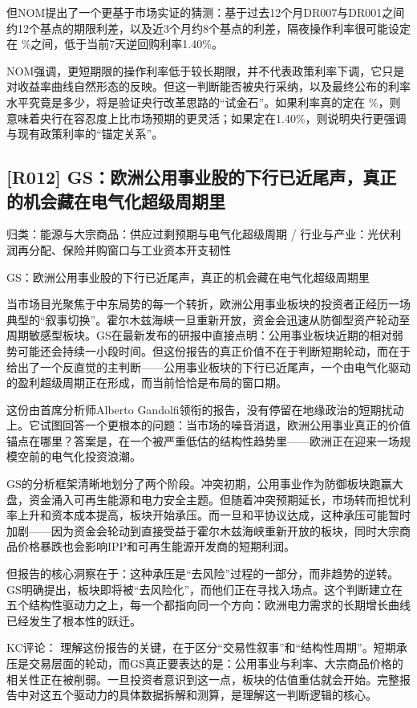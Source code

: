 \documentclass[11pt]{ctexart}
\begin{document}
但NOM提出了一个更基于市场实证的猜测：基于过去12个月DR007与DR001之间约12个基点的期限利差，以及近3个月约8个基点的利差，隔夜操作利率很可能设定在 \%之间，低于当前7天逆回购利率1.40\%。

NOM强调，更短期限的操作利率低于较长期限，并不代表政策利率下调，它只是对收益率曲线自然形态的反映。但这一判断能否被央行采纳，以及最终公布的利率水平究竟是多少，将是验证央行改革思路的“试金石”。如果利率真的定在 \%，则意味着央行在容忍度上比市场预期的更灵活；如果定在1.40\%，则说明央行更强调与现有政策利率的“锚定关系”。

\subsection{[R012] GS：欧洲公用事业股的下行已近尾声，真正的机会藏在电气化超级周期里}
{\small\color{refgray}归类：能源与大宗商品：供应过剩预期与电气化超级周期 / 行业与产业：光伏利润再分配、保险并购窗口与工业资本开支韧性}

GS：欧洲公用事业股的下行已近尾声，真正的机会藏在电气化超级周期里

当市场目光聚焦于中东局势的每一个转折，欧洲公用事业板块的投资者正经历一场典型的“叙事切换”。霍尔木兹海峡一旦重新开放，资金会迅速从防御型资产轮动至周期敏感型板块。GS在最新发布的研报中直接点明：公用事业板块近期的相对弱势可能还会持续一小段时间。但这份报告的真正价值不在于判断短期轮动，而在于给出了一个反直觉的主判断——公用事业板块的下行已近尾声，一个由电气化驱动的盈利超级周期正在形成，而当前恰恰是布局的窗口期。

这份由首席分析师Alberto Gandolfi领衔的报告，没有停留在地缘政治的短期扰动上。它试图回答一个更根本的问题：当市场的噪音消退，欧洲公用事业真正的价值锚点在哪里？答案是，在一个被严重低估的结构性趋势里——欧洲正在迎来一场规模空前的电气化投资浪潮。

GS的分析框架清晰地划分了两个阶段。冲突初期，公用事业作为防御板块跑赢大盘，资金涌入可再生能源和电力安全主题。但随着冲突预期延长，市场转而担忧利率上升和资本成本提高，板块开始承压。而一旦和平协议达成，这种承压可能暂时加剧——因为资金会轮动到直接受益于霍尔木兹海峡重新开放的板块，同时大宗商品价格暴跌也会影响IPP和可再生能源开发商的短期利润。

但报告的核心洞察在于：这种承压是“去风险”过程的一部分，而非趋势的逆转。GS明确提出，板块即将被“去风险化”，而他们正在寻找入场点。这个判断建立在五个结构性驱动力之上，每一个都指向同一个方向：欧洲电力需求的长期增长曲线已经发生了根本性的跃迁。

KC评论： 理解这份报告的关键，在于区分“交易性叙事”和“结构性周期”。短期承压是交易层面的轮动，而GS真正要表达的是：公用事业与利率、大宗商品价格的相关性正在被削弱。一旦投资者意识到这一点，板块的估值重估就会开始。完整报告中对这五个驱动力的具体数据拆解和测算，是理解这一判断逻辑的核心。
\end{document}
